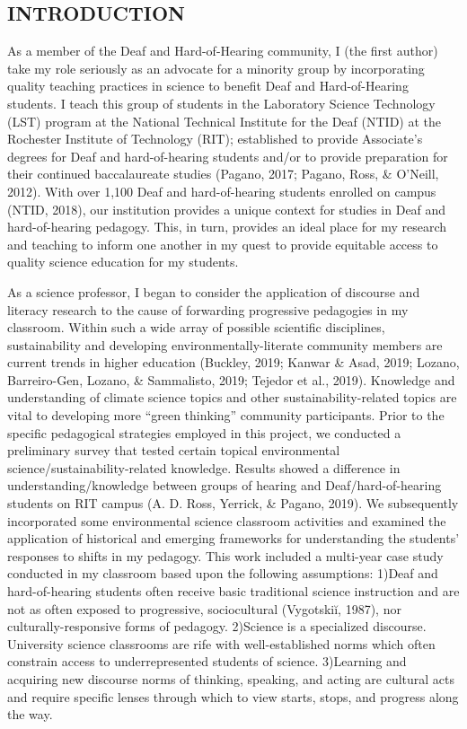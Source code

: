 \documentclass[11.5pt]{sig-alternate} %
\begin{document}
\begin{large}
\section*{INTRODUCTION}
    
As a member of the Deaf and Hard-of-Hearing community, I (the first author) take my role seriously as an advocate for a minority group by incorporating quality teaching practices in science to benefit Deaf and Hard-of-Hearing students. I teach this group of students in the Laboratory Science Technology (LST) program at the National Technical Institute for the Deaf (NTID) at the Rochester Institute of Technology (RIT); established to provide Associate’s degrees for Deaf and hard-of-hearing students and/or to provide preparation for their continued baccalaureate studies (Pagano, 2017; Pagano, Ross, \& O’Neill, 2012). With over 1,100 Deaf and hard-of-hearing students enrolled on campus (NTID, 2018), our institution provides a unique context for studies in Deaf and hard-of-hearing pedagogy. This, in turn, provides an ideal place for my research and teaching to inform one another in my quest to provide equitable access to quality science education for my students. 

As a science professor, I began to consider the application of discourse and literacy research to the cause of forwarding progressive pedagogies in my classroom. Within such a wide array of possible scientific disciplines, sustainability and developing environmentally-literate community members are current trends in higher education (Buckley, 2019; Kanwar \& Asad, 2019; Lozano, Barreiro-Gen, Lozano, \& Sammalisto, 2019; Tejedor et al., 2019). Knowledge and understanding of climate science topics and other sustainability-related topics are vital to developing more “green thinking” community participants. Prior to the specific pedagogical strategies employed in this project, we conducted a preliminary survey that tested certain topical environmental science/sustainability-related knowledge. Results showed a difference in understanding/knowledge between groups of hearing and Deaf/hard-of-hearing students on RIT campus (A. D. Ross, Yerrick, \& Pagano, 2019). We subsequently incorporated some environmental science classroom activities and examined the application of historical and emerging frameworks for understanding the students’ responses to shifts in my pedagogy. This work included a multi-year case study conducted in my classroom based upon the following assumptions: 1)Deaf and hard-of-hearing students often receive basic traditional science instruction and are not as often exposed to progressive, sociocultural (Vygotskiĭ, 1987), nor culturally-responsive forms of pedagogy. 2)Science is a specialized discourse. University science classrooms are rife with well-established norms which often constrain access to underrepresented students of science. 3)Learning and acquiring new discourse norms of thinking, speaking, and acting are cultural acts and require specific lenses through which to view starts, stops, and progress along the way.


\end{large}
\end{document}
